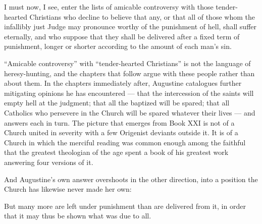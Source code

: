 \begin{studyframe}
I must now, I see, enter the lists of amicable controversy with those tender-hearted Christians who decline to believe that any, or that all of those whom the infallibly just Judge may pronounce worthy of the punishment of hell, shall suffer eternally, and who suppose that they shall be delivered after a fixed term of punishment, longer or shorter according to the amount of each man's sin.
\end{studyframe}

``Amicable controversy'' with ``tender-hearted Christians'' is not the language of heresy-hunting, and the chapters that follow argue with these people rather than about them. In the chapters immediately after, Augustine catalogues further mitigating opinions he has encountered --- that the intercession of the saints will empty hell at the judgment; that all the baptized will be spared; that all Catholics who persevere in the Church will be spared whatever their lives --- and answers each in turn. The picture that emerges from Book XXI is not of a Church united in severity with a few Origenist deviants outside it. It is of a Church in which the merciful reading was common enough among the faithful that the greatest theologian of the age spent a book of his greatest work answering four versions of it.

And Augustine's own answer overshoots in the other direction, into a position the Church has likewise never made her own:

\begin{studyframe}
But many more are left under punishment than are delivered from it, in order that it may thus be shown what was due to all.
\end{studyframe}

